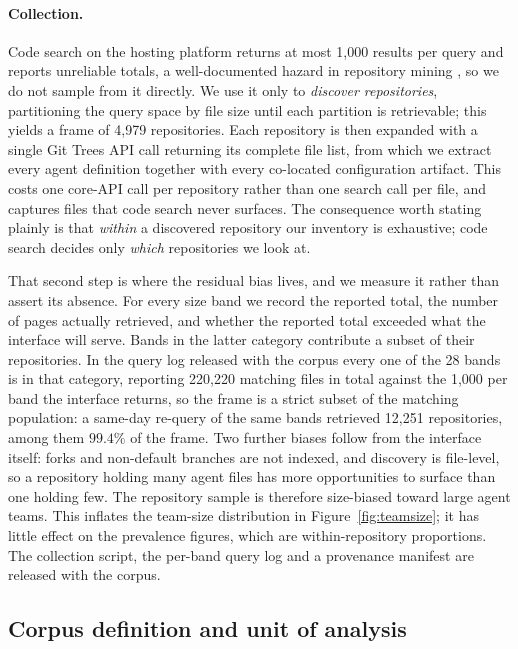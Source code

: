 \documentclass[smallextended,natbib]{svjour3}
\begin{document}
\paragraph{Collection.}
\label{sec:collection}
Code search on the hosting platform returns at most 1{,}000 results per query and reports unreliable
totals, a well-documented hazard in repository mining \citep{kalliamvakou2016promises}, so we do
not sample from it directly. We use it only to \emph{discover repositories},
partitioning the query space by file size until each partition is retrievable; this yields a frame of
4{,}979 repositories. Each repository is then expanded with a single Git Trees API call returning its
complete file list, from which we extract every agent definition together with every co-located
configuration artifact. This costs one core-API call per repository rather than one search call per
file, and captures files that code search never surfaces. The consequence worth stating plainly is
that \emph{within} a discovered repository our inventory is exhaustive; code search decides only
\emph{which} repositories we look at.

That second step is where the residual bias lives, and we measure it rather than assert its absence.
For every size band we record the reported total, the number of pages actually retrieved, and whether
the reported total exceeded what the interface will serve. Bands in the latter category contribute a
subset of their repositories. In the query log released with the corpus every one of the 28 bands
is in that category, reporting 220{,}220 matching files in total against the 1{,}000 per band the
interface returns, so the frame is a strict subset of the matching population: a same-day re-query
of the same bands retrieved 12{,}251 repositories, among them $99.4\%$ of the frame. Two further
biases follow from the interface itself: forks and non-default branches are not indexed, and
discovery is file-level, so a repository holding many agent files has more opportunities to surface
than one holding few. The repository sample is therefore size-biased toward large agent teams. This
inflates the team-size distribution in Figure~\ref{fig:teamsize}; it has little effect on the
prevalence figures, which are within-repository proportions. The collection script, the per-band
query log and a provenance manifest are released with the corpus.

\subsection{Corpus definition and unit of analysis}
\label{sec:corpus}
\end{document}
